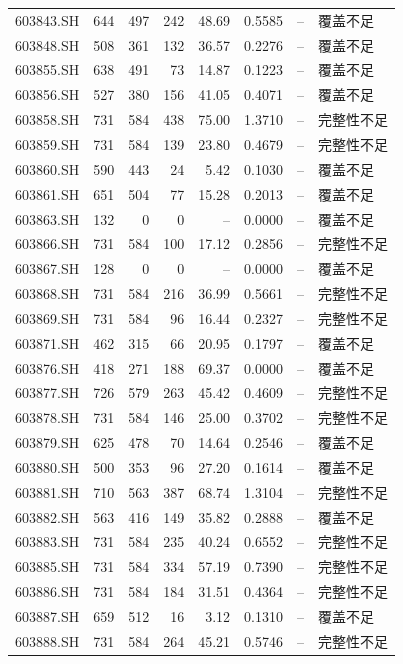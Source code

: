 \documentclass[10pt,a4paper]{article}
\begin{document}
\begin{longtable}{lrrr r r r l}
603843.SH & 644 & 497 & 242 & 48.69 & 0.5585 & -- & 覆盖不足\\
603848.SH & 508 & 361 & 132 & 36.57 & 0.2276 & -- & 覆盖不足\\
603855.SH & 638 & 491 & 73 & 14.87 & 0.1223 & -- & 覆盖不足\\
603856.SH & 527 & 380 & 156 & 41.05 & 0.4071 & -- & 覆盖不足\\
603858.SH & 731 & 584 & 438 & 75.00 & 1.3710 & -- & 完整性不足\\
603859.SH & 731 & 584 & 139 & 23.80 & 0.4679 & -- & 完整性不足\\
603860.SH & 590 & 443 & 24 & 5.42 & 0.1030 & -- & 覆盖不足\\
603861.SH & 651 & 504 & 77 & 15.28 & 0.2013 & -- & 覆盖不足\\
603863.SH & 132 & 0 & 0 & -- & 0.0000 & -- & 覆盖不足\\
603866.SH & 731 & 584 & 100 & 17.12 & 0.2856 & -- & 完整性不足\\
603867.SH & 128 & 0 & 0 & -- & 0.0000 & -- & 覆盖不足\\
603868.SH & 731 & 584 & 216 & 36.99 & 0.5661 & -- & 完整性不足\\
603869.SH & 731 & 584 & 96 & 16.44 & 0.2327 & -- & 完整性不足\\
603871.SH & 462 & 315 & 66 & 20.95 & 0.1797 & -- & 覆盖不足\\
603876.SH & 418 & 271 & 188 & 69.37 & 0.0000 & -- & 覆盖不足\\
603877.SH & 726 & 579 & 263 & 45.42 & 0.4609 & -- & 完整性不足\\
603878.SH & 731 & 584 & 146 & 25.00 & 0.3702 & -- & 完整性不足\\
603879.SH & 625 & 478 & 70 & 14.64 & 0.2546 & -- & 覆盖不足\\
603880.SH & 500 & 353 & 96 & 27.20 & 0.1614 & -- & 覆盖不足\\
603881.SH & 710 & 563 & 387 & 68.74 & 1.3104 & -- & 完整性不足\\
603882.SH & 563 & 416 & 149 & 35.82 & 0.2888 & -- & 覆盖不足\\
603883.SH & 731 & 584 & 235 & 40.24 & 0.6552 & -- & 完整性不足\\
603885.SH & 731 & 584 & 334 & 57.19 & 0.7390 & -- & 完整性不足\\
603886.SH & 731 & 584 & 184 & 31.51 & 0.4364 & -- & 完整性不足\\
603887.SH & 659 & 512 & 16 & 3.12 & 0.1310 & -- & 覆盖不足\\
603888.SH & 731 & 584 & 264 & 45.21 & 0.5746 & -- & 完整性不足\\

\end{longtable}
\end{document}
